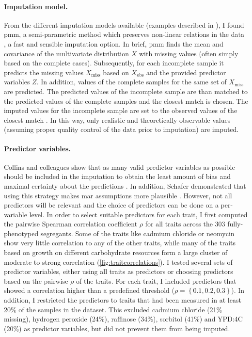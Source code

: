 \paragraph{Imputation model.}From the different imputation models available (examples described in \citep{vanBuuren2011}), I found \gls{pmm}, a semi-parametric method which preserves non-linear relations in the data \citep{Little1988,vanBuuren2011}, a fast and sensible imputation option.  In brief, \gls{pmm} finds the mean and covariance of the multivariate distribution \(X\) with missing values (often simply based on the complete cases). Subsequently, for each incomplete sample it predicts the missing values \(X_\text{miss}\) based on \(X_\text{obs}\) and the provided predictor variables \(Z\). In addition, values of the complete samples for the same set of \(X_\text{miss}\) are predicted. The predicted values of the incomplete sample are than matched to the predicted values of the complete samples and the closest match is chosen. The imputed values for the incomplete sample are set to the observed values of the closest match \citep{Little1988}. In this way, only realistic and theoretically observable values (assuming proper quality control of the data prior to imputation) are imputed.

\paragraph{Predictor variables.} Collins and colleagues show that as many valid predictor variables as possible should be included in the imputation to obtain the least amount of bias and maximal certainty about the predictions \citeyear{Collins2001}. In addition, Schafer demonstrated that using this strategy makes \gls{mar} assumptions more plausible \citep{Schafer1997}. However, not all predictors will be relevant and the choice of predictors can be done on a per-variable level. In order to select suitable predictors for each trait, I first computed the pairwise Spearman correlation coefficient \(\rho\) for all traits across the \num{303} fully-phenotyped segregants. Some of the traits like cadmium chloride or neomycin show very little correlation to any of the other traits, while many of the traits based on growth on different carbohydrate resources form a large cluster of moderate to strong correlation (\cref{fig:traitcorrelations}). 
I tested several sets of predictor variables, either using all traits as predictors or choosing predictors based on the pairwise \(\rho\) of the traits. For each trait, I included predictors that showed a correlation higher than a predefined threshold (\(\rho =\left\{0.1, 0.2, 0.3\right\}\)). In addition, I restricted the predictors to traits that had been measured in at least 20\% of the samples in the dataset. This excluded cadmium chloride  (21\% missing), hydrogen peroxide (24\%), raffinose (34\%), sorbitol (41\%) and YPD:4C (20\%) as predictor variables, but did not prevent them from being imputed.

